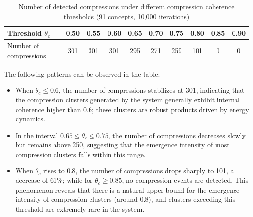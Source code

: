 \documentclass[10pt,onecolumn]{article}
\begin{document}
\begin{table}[H]
\centering
\caption{Number of detected compressions under different compression coherence thresholds (91 concepts, 10,000 iterations)}
\label{tab:threshold_scan}
\begin{tabular}{lccccccccc}
\toprule
Threshold $\theta_c$ & 0.50 & 0.55 & 0.60 & 0.65 & 0.70 & 0.75 & 0.80 & 0.85 & 0.90 \\
\midrule
Number of compressions & 301 & 301 & 301 & 295 & 271 & 259 & 101 & 0 & 0 \\
\bottomrule
\end{tabular}
\end{table}

The following patterns can be observed in the table:
\begin{itemize}
    \item When $\theta_c \leq 0.6$, the number of compressions stabilizes at 301, indicating that the compression clusters generated by the system generally exhibit internal coherence higher than 0.6; these clusters are robust products driven by energy dynamics.
    \item In the interval $0.65 \leq \theta_c \leq 0.75$, the number of compressions decreases slowly but remains above 250, suggesting that the emergence intensity of most compression clusters falls within this range.
    \item When $\theta_c$ rises to 0.8, the number of compressions drops sharply to 101, a decrease of 61\%; while for $\theta_c \geq 0.85$, no compression events are detected. This phenomenon reveals that there is a natural upper bound for the emergence intensity of compression clusters (around 0.8), and clusters exceeding this threshold are extremely rare in the system.
\end{itemize}
\end{document}
